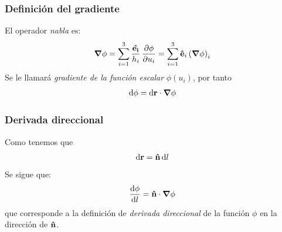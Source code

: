 \documentclass[12pt]{beamer}
\begin{document}
\begin{frame}
\frametitle{Definición del gradiente}
El operador \emph{nabla} es:
\begin{align}
\grad{\phi} = \sum_{i=1}^{3} \dfrac{\vu{e_{i}}}{h_{i}} \, \pdv{\phi}{u_{i}} = \sum_{i=1}^{3} \vu{e}_{i} \left( \grad{\phi} \right)_{i}
\label{eq:ecuacion_01_28}
\end{align}
\pause
Se le llamará \emph{gradiente de la función escalar} $\phi(u_{i})$, por tanto
\begin{align}
\dd{\phi} = \dd{\vb{r}} \cdot \grad{\phi}
\label{eq:ecuacion_01_29}
\end{align}
\end{frame}
\begin{frame}
\frametitle{Derivada direccional}
Como tenemos que
\begin{align*}
\dd{\vb{r}} = \vu{n} \dd{l}
\end{align*}
\pause
Se sigue que:
\begin{align*}
\dv{\phi}{l} = \vu{n} \cdot \grad{\phi}
\end{align*}
que corresponde a la definición de \emph{derivada direccional} de la función $\phi$ en la dirección de $\vu{n}$.
\end{frame}
\end{document}
